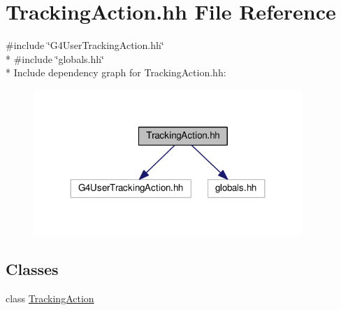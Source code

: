 \hypertarget{TrackingAction_8hh}{}\section{Tracking\+Action.\+hh File Reference}
\label{TrackingAction_8hh}
{\ttfamily \#include \char`\"{}G4\+User\+Tracking\+Action.\+hh\char`\"{}}\\*
{\ttfamily \#include \char`\"{}globals.\+hh\char`\"{}}\\*
Include dependency graph for Tracking\+Action.\+hh\+:
\nopagebreak
\begin{figure}[H]
\begin{center}
\leavevmode
\includegraphics[width=288pt]{TrackingAction_8hh__incl}
\end{center}
\end{figure}
\subsection*{Classes}
\begin{DoxyCompactItemize}
\item 
class \hyperlink{classTrackingAction}{Tracking\+Action}
\end{DoxyCompactItemize}
